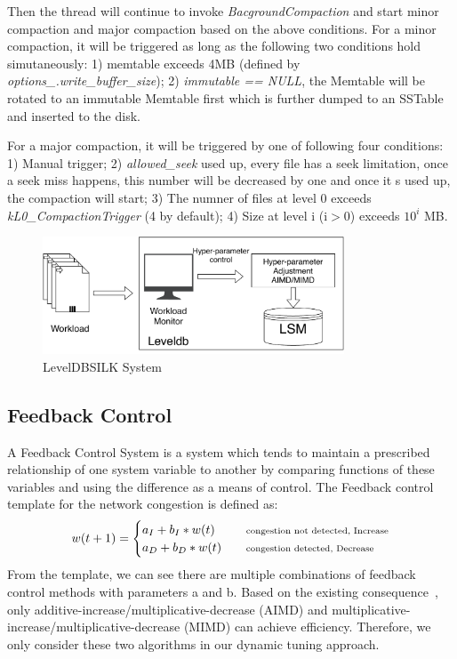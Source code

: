 \documentclass[letter,twocolumn,10pt]{article}
\begin{document}
Then the thread will continue to invoke \textit{BacgroundCompaction} and start minor compaction and major compaction based on the above conditions.
For a minor compaction, it will be triggered as long as the following two conditions hold simutaneously: 1) memtable exceeds 4MB (defined by \textit{options\_.write\_buffer\_size}); 2) \textit{immutable == NULL}, the Memtable will be rotated to an immutable Memtable first which is further dumped to an SSTable and inserted to the disk.
 
For a major compaction, it will be triggered by one of following four conditions: 1) Manual trigger; 2) \textit{allowed\_seek} used up, every file has a seek limitation, once a seek miss happens, this number will be decreased by one and once it s used up, the compaction will start; 3) The numner of files at level 0 exceeds \textit{kL0\_CompactionTrigger} (4 by default); 4) Size at level i (i$>$0) exceeds $10^i$ MB.

\begin{figure}[!htbp]
\centering
\includegraphics[width=0.8\textwidth]{./system.pdf}
\caption{LevelDBSILK System}
\label{system}
\end{figure}

\subsection{Feedback Control}
A Feedback Control System is a system which tends to maintain a prescribed relationship of one system variable to another by comparing functions of these variables and using the difference as a means of control.  The Feedback control template for the network congestion is defined as:
$$ w(t+1) = \begin{cases} a_I+b_I*w(t)  & \quad \text{\scriptsize{congestion not detected, Increase}}
 \\a_D + b_D*w(t) & \quad \text{\scriptsize{congestion detected, Decrease}} \end{cases} $$
From the template, we can see there are multiple combinations of feedback control methods with parameters a and b. Based on the existing consequence~\cite{tcp:congestion:control}, only additive-increase/multiplicative-decrease (AIMD) and multiplicative-increase/multiplicative-decrease (MIMD) can achieve efficiency.
Therefore, we only consider these two algorithms in our dynamic tuning approach. 
\end{document}
